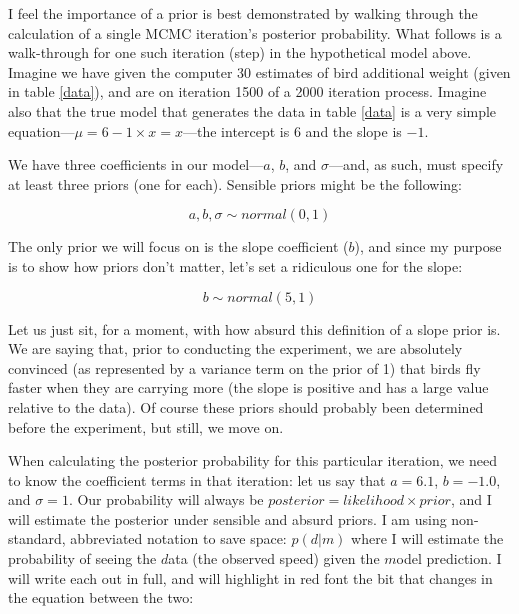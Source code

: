 \documentclass[12pt]{report}
\begin{document}
I feel the importance of a prior is best demonstrated by walking through the calculation of a single MCMC iteration's posterior probability. What follows is a walk-through for one such iteration (step) in the hypothetical model above. Imagine we have given the computer 30 estimates of bird additional weight (given in table \ref{data}), and are on iteration 1500 of a 2000 iteration process. Imagine also that the true model that generates the data in table \ref{data} is a very simple equation---$\mu = 6 - 1 \times x = x$---the intercept is $6$ and the slope is $-1$.

We have three coefficients in our model---$a$, $b$, and $\sigma$---and, as such, must specify at least three priors (one for each). Sensible priors might be the following:

\begin{equation}
  a,b,\sigma \sim normal(0, 1)
  \label{sensible-priors}
\end{equation}

The only prior we will focus on is the slope coefficient ($b$), and since my purpose is to show how priors don't matter, let's set a ridiculous one for the slope:

\begin{equation}
  b \sim normal(5, 1)
  \label{absurd-prior}
\end{equation}

Let us just sit, for a moment, with how absurd this definition of a slope prior is. We are saying that, prior to conducting the experiment, we are absolutely convinced (as represented by a variance term on the prior of 1) that birds fly faster when they are carrying more (the slope is positive and has a large value relative to the data). Of course these priors should probably been determined before the experiment, but still, we move on.

When calculating the posterior probability for this particular iteration, we need to know the coefficient terms in that iteration: let us say that $a=6.1$, $b=-1.0$, and $\sigma=1$. Our probability will always be $posterior = likelihood \times prior$, and I will estimate the posterior under sensible and absurd priors. I am using non-standard, abbreviated notation to save space: $p(d|m)$ where I will estimate the probability of seeing the $d$ata (the observed speed) given the $m$odel prediction. I will write each out in full, and will highlight in red font the bit that changes in the equation between the two:
\end{document}
